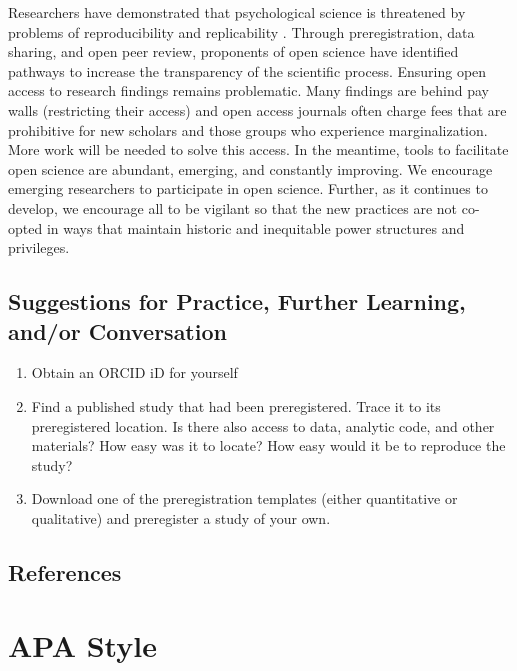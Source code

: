 \documentclass[
  11pt,
]{book}
\providecommand{\tightlist}{%
  \setlength{\itemsep}{0pt}\setlength{\parskip}{0pt}}
\begin{document}
Researchers have demonstrated that psychological science is threatened by problems of reproducibility and replicability \citep{open_science_collaboration_estimating_2015}. Through preregistration, data sharing, and open peer review, proponents of open science have identified pathways to increase the transparency of the scientific process. Ensuring open access to research findings remains problematic. Many findings are behind pay walls (restricting their access) and open access journals often charge fees that are prohibitive for new scholars and those groups who experience marginalization. More work will be needed to solve this access. In the meantime, tools to facilitate open science are abundant, emerging, and constantly improving. We encourage emerging researchers to participate in open science. Further, as it continues to develop, we encourage all to be vigilant so that the new practices are not co-opted in ways that maintain historic and inequitable power structures and privileges.

\hypertarget{suggestions-for-practice-further-learning-andor-conversation}{%
\section{Suggestions for Practice, Further Learning, and/or Conversation}\label{suggestions-for-practice-further-learning-andor-conversation}}

\begin{enumerate}
\def\labelenumi{\arabic{enumi}.}
\tightlist
\item
  Obtain an ORCID iD for yourself
\item
  Find a published study that had been preregistered. Trace it to its preregistered location. Is there also access to data, analytic code, and other materials? How easy was it to locate? How easy would it be to reproduce the study?
\item
  Download one of the preregistration templates (either quantitative or qualitative) and preregister a study of your own.
\end{enumerate}

\hypertarget{references-1}{%
\section{References}\label{references-1}}

\hypertarget{APAstyle}{%
\chapter{APA Style}\label{APAstyle}}
\end{document}
